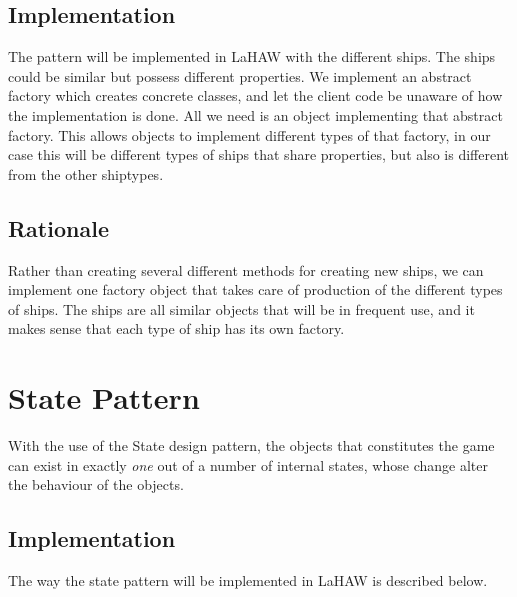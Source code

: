     \subsection{Implementation}
    The pattern will be implemented in LaHAW with the different ships. The ships could be similar but possess different properties. We implement an abstract factory which creates concrete classes, and let the client code be unaware of how the implementation is done. All we need is an object implementing that abstract factory. This allows objects to implement different types of that factory, in our case this will be different types of ships that share properties, but also is different from the other shiptypes.

    \subsection{Rationale}
    Rather than creating several different methods for creating new ships, we can implement one factory object that takes care of production of the different types of ships. The ships are all similar objects that will be in frequent use, and it makes sense that each type of ship has its own factory.


    \section{State Pattern}
    
    With the use of the State design pattern, the objects that constitutes the game can exist in exactly \emph{one} out of a number of internal states, whose change alter the behaviour of the objects.\cite{online:statepattern}
    
    
        \subsection{Implementation}
        The way the state pattern will be implemented in LaHAW is described below.
    

